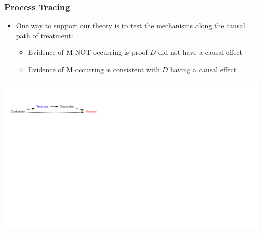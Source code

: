 \documentclass[xcolor=x11names,compress]{beamer}\usepackage[]{graphicx}\usepackage[]{color}
\newenvironment{knitrout}{}{} %
\renewcommand{\(}{\begin{columns}}
\renewcommand{\)}{\end{columns}}
\newcommand{\<}[1]{\begin{column}{#1}}
\renewcommand{\>}{\end{column}}
\begin{document}
\begin{frame}
\frametitle{Process Tracing}
\begin{itemize}
\item One way to support our theory is to test the mechanisms along the causal path of treatment:
\begin{itemize}
\item Evidence of M NOT occurring is proof $D$ did not have a causal effect
\item Evidence of M occurring is consistent with $D$ having a causal effect
\end{itemize}
\end{itemize}
\begin{knitrout}
\color{fgcolor}
\includegraphics[width=1.8\linewidth]{figure/Dag2-1} 

\end{knitrout}
\end{frame}
\end{document}
